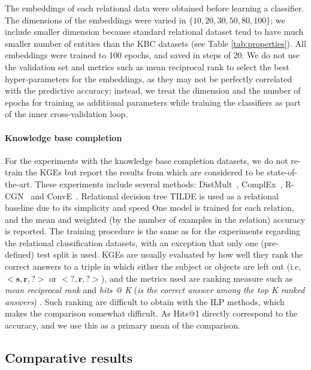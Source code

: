 The embeddings of each relational data were obtained before learning a classifier.
The dimensions of the embeddings were varied in $\{10, 20, 30, 50, 80, 100\}$; we include smaller dimension because standard relational dataset tend to have much smaller number of entities than the KBC datasets (see Table \ref{tab:properties}).
All embeddings were trained to 100 epochs, and saved in steps of 20.
We do not use the validation set and metrics such as mean reciprocal rank to select the best hyper-parameters for the embeddings, as they may not be perfectly correlated with the predictive accuracy; instead, we treat the dimension and the number of epochs for training as additional parameters while training the classifiers as part of the inner cross-validation loop. 


\paragraph{Knowledge base completion}
For the experiments with the knowledge base completion datasets, we do not re-train the KGEs but report the results from \cite{dettmers2018conve} which are considered to be state-of-the-art.
These experiments include several methods: DistMult~\cite{YangYHGD14a}, ComplEx~\cite{trouillon2016complex}, R-CGN~\cite{Schlichtkrull2017ModelingRD} and ConvE~\cite{dettmers2018conve}.
Relational decision tree TILDE is used as a relational baseline due to its simplicity and speed
One model is trained for each relation, and the mean and weighted (by the number of examples in the relation) accuracy is reported. 
The training procedure is the same as for the experiments regarding the relational classification datasets, with an exception that only one (pre-defined) test split is used. 
KGEs are usually evaluated by how well they rank the correct answers to a triple in which either the subject or objects are left out (i.e, $<\mathbf{s},\mathbf{r},\mathbf{?}>$ or $<\mathbf{?},\mathbf{r},\mathbf{?}>$), and the metrics used are ranking measure such as \textit{mean reciprocal rank} and \textit{hits @ K} (\textit{is the correct answer among the top K ranked answers}) \cite{BordesNIPS2013}.
Such ranking are difficult to obtain with the ILP methods, which makes the comparison somewhat difficult.
As Hits@1 directly correspond to the accuracy, and we use this as a primary mean of the comparison.  







\subsection{Comparative results}

